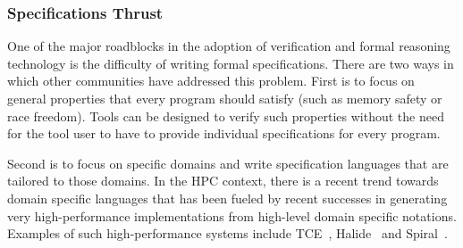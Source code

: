 
\subsubsection{Specifications Thrust} 
\label{subsec:spec}

One of the major roadblocks in the adoption of verification and formal reasoning technology is the difficulty of writing formal specifications. There are two ways in which other communities have addressed this problem. First is to focus on general properties that every program should satisfy (such as memory safety or race freedom). Tools can be designed to verify such properties without the need for the tool user to have to provide individual specifications for every program. 

Second is to focus on specific domains and write specification languages that are tailored to those domains. 
%
In the HPC context, there is a recent trend towards domain specific languages that has been fueled by recent successes in generating very high-performance implementations from high-level domain specific notations. Examples of such high-performance systems include TCE~\cite{baumgartner2005synthesis,hirata2003tensor}, Halide~\cite{DBLP:conf/pldi/Ragan-KelleyBAPDA13} and Spiral~\cite{puschel2005spiral}. 

